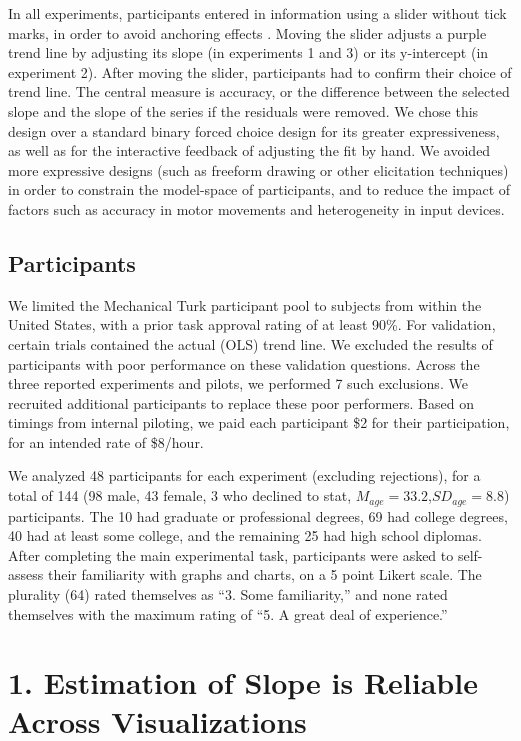 \documentclass{sigchi}
\begin{document}
In all experiments, participants entered in information using a slider without tick marks, in order to avoid anchoring effects \cite{matejka2016effect}. Moving the slider adjusts a purple trend line by adjusting its slope (in experiments 1 and 3) or its y-intercept (in experiment 2). After moving the slider, participants had to confirm their choice of trend line. The central measure is accuracy, or the difference between the selected slope and the slope of the series if the residuals were removed. We chose this design over a standard binary forced choice design for its greater expressiveness, as well as for the interactive feedback of adjusting the fit by hand. We avoided more expressive designs (such as freeform drawing or other elicitation techniques) in order to constrain the model-space of participants, and to reduce the impact of factors such as accuracy in motor movements and heterogeneity in input devices.

\subsection{Participants}

We limited the Mechanical Turk participant pool to subjects from within the United States, with a prior task approval rating of at least 90\%. For validation, certain trials contained the actual (OLS) trend line. We excluded the results of participants with poor performance on these validation questions. Across the three reported experiments and pilots, we performed 7 such exclusions. We recruited additional participants to replace these poor performers. Based on timings from internal piloting, we paid each participant \$2 for their participation, for an intended rate of \$8/hour. 

We analyzed 48 participants for each experiment (excluding rejections), for a total of 144 (98 male, 43 female, 3 who declined to stat, $M_{age}= 33.2$,$SD_{age}=8.8$) participants. The 10 had graduate or professional degrees, 69 had college degrees, 40 had at least some college, and the remaining 25 had high school diplomas. After completing the main experimental task, participants were asked to self-assess their familiarity with graphs and charts, on a 5 point Likert scale. The plurality (64) rated themselves as ``3. Some familiarity,'' and none rated themselves with the maximum rating of ``5. A great deal of experience.'' 

\section{1. Estimation of Slope is Reliable \\ Across Visualizations}
\end{document}
